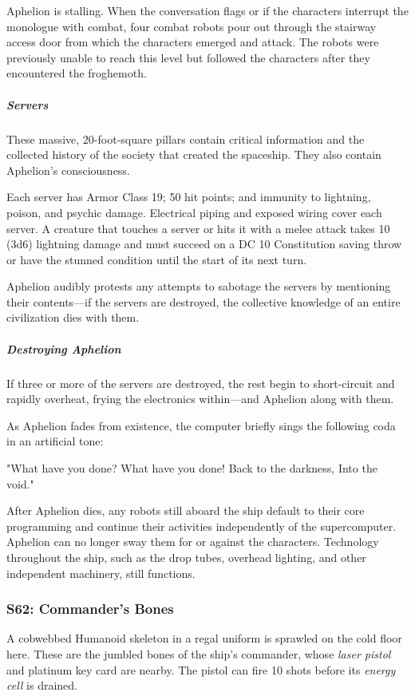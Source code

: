 \documentclass[10pt,a4paper,twoside,bg=print,twocolumn,openany,nodeprecatedcode]{dndbook}
\begin{document}
Aphelion is stalling. When the conversation flags or if the characters interrupt the monologue with combat, four combat robots pour out through the stairway access door from which the characters emerged and attack. The robots were previously unable to reach this level but followed the characters after they encountered the froghemoth.

\subparagraph{Servers}
These massive, 20-foot-square pillars contain critical information and the collected history of the society that created the spaceship. They also contain Aphelion's consciousness.

Each server has Armor Class 19; 50 hit points; and immunity to lightning, poison, and psychic damage. Electrical piping and exposed wiring cover each server. A creature that touches a server or hits it with a melee attack takes 10 (3d6) lightning damage and must succeed on a DC 10 Constitution saving throw or have the stunned condition until the start of its next turn.

Aphelion audibly protests any attempts to sabotage the servers by mentioning their contents—if the servers are destroyed, the collective knowledge of an entire civilization dies with them.

\subparagraph{Destroying Aphelion}
If three or more of the servers are destroyed, the rest begin to short-circuit and rapidly overheat, frying the electronics within—and Aphelion along with them.

As Aphelion fades from existence, the computer briefly sings the following coda in an artificial tone:

\begin{DndReadAloud}{}
"What have you done? What have you done! Back to the darkness, Into the void."

\end{DndReadAloud}

After Aphelion dies, any robots still aboard the ship default to their core programming and continue their activities independently of the supercomputer. Aphelion can no longer sway them for or against the characters. Technology throughout the ship, such as the drop tubes, overhead lighting, and other independent machinery, still functions.

\subsubsection{S62: Commander's Bones}
A cobwebbed Humanoid skeleton in a regal uniform is sprawled on the cold floor here. These are the jumbled bones of the ship's commander, whose \textit{laser pistol} and platinum key card are nearby. The pistol can fire 10 shots before its \textit{energy cell} is drained.
\end{document}
